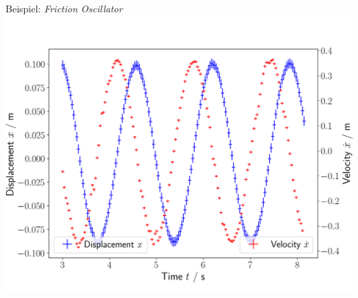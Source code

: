 \documentclass[9pt]{beamer}
\begin{document}
\begin{frame}{Beispiel: \emph{Friction Oscillator}}
  \includegraphics[width=\textwidth]{photos/oscillation}
  
\end{frame}
\end{document}
